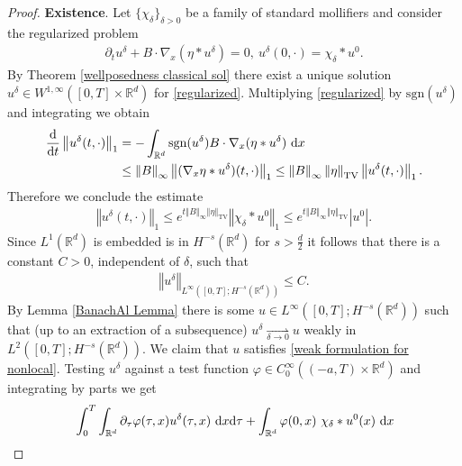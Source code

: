 \documentclass[11pt,reqno]{amsart}
\numberwithin{equation}{section}
\def\dd{{\rm d}}
\begin{document}
\begin{proof}
\textbf{Existence}. Let $\{\chi_{\delta}\}_{\delta>0}$ be a family of standard mollifiers and consider the regularized problem 
\begin{align}
\partial_{t}u^{\delta}+B\cdot \nabla_{x}(\eta\ast u^{\delta})=0, \ u^{\delta}(0,\cdot)=\chi_{\delta}\ast u^{0}.\label{regularized}     
\end{align}
By Theorem
\ref{wellposedness classical sol} there exist a unique solution $u^{\delta}\in W^{1,\infty}([0,T]\times \mathbb{R}^{d})$ for \eqref{regularized}. 
Multiplying \eqref{regularized} by $\mathrm{sgn}(u^{\delta})$ and integrating we obtain  
\begin{align*}
\frac{\dd}{\dd t}\left\Vert u^{\delta}(t,\cdot)\right\Vert_{1}&=-\int_{\mathbb{R}^{d}}\mathrm{sgn}(u^{\delta})B\cdot \nabla_{x}(\eta\ast u^{\delta})\ \dd x\\
&\leq \left\Vert B\right\Vert_{\infty}\left\Vert (\nabla_{x}\eta \ast u^{\delta})(t,\cdot)\right\Vert_{1}\leq \left\Vert B\right\Vert_{\infty}\left\Vert \eta\right\Vert_{\mathrm{TV}}\left\Vert u^{\delta}(t,\cdot)\right\Vert_{1}.        
\end{align*}
Therefore we conclude the estimate 
\begin{align}
\left\Vert u^{\delta}(t,\cdot)\right\Vert_{1}\leq e^{t\left\Vert B\right\Vert_{\infty}\left\Vert \eta\right\Vert_{\mathrm{TV}} }\left\Vert \chi_{\delta}\ast u^{0}\right\Vert_{1} \leq e^{t\left\Vert B\right\Vert_{\infty}\left\Vert \eta\right\Vert_{\mathrm{TV}} }\left\vert u^
{0}\right\vert.  
\label{L1 uniform in eta}      
\end{align}
Since $L^{1}(\mathbb{R}^{d})$ is embedded is in $H^{-s}(\mathbb{R}^{d})$ for $s>\frac{d}{2}$ it follows that there is a constant $C>0$, independent of $\delta$, such that  
\begin{align*}
\left\Vert u
^{\delta}\right\Vert_{L^{\infty}([0,T];H^{-s}(\mathbb{R}^
{d}))}\leq C.      
\end{align*}
By Lemma \ref{BanachAl Lemma} there is some $u\in L^{\infty}([0,T];H^{-s}(\mathbb{R}^{d}))$ such that (up to an extraction of a subsequence) $u^{\delta}\underset{\delta \rightarrow 0}{\rightharpoonup} u$ weakly in $L^{2}([0,T];H^{-s}(\mathbb{R}^{d}
))$. 
We claim that $u$ satisfies \eqref{weak formulation for nonlocal}. Testing $u^{\delta}$ against a test function $\varphi\in C^{\infty}_{0}((-a,T)\times \mathbb{R}^{d})$ and integrating by parts we get 
\begin{align}
&\int_{0}^{T}\int_{\mathbb{R}^{d}}\partial_{\tau}\varphi(\tau,x) u^{\delta}(\tau,x)\ \dd x\dd \tau+\int_{\mathbb{R}^{d}}\varphi(0,x)\  \chi_{\delta}\ast u^{0}(x)\ \dd x \notag\\

\end{align}
\end{proof}
\end{document}
